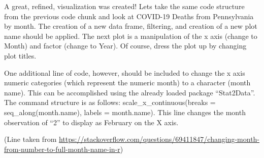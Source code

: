 \documentclass[
]{article}
\begin{document}
A great, refined, visualization was created! Lets take the same code
structure from the previous code chunk and look at COVID-19 Deaths from
Pennsylvania by month. The creation of a new data frame, filtering, and
creation of a new plot name should be applied. The next plot is a
manipulation of the x axis (change to Month) and factor (change to
Year). Of course, dress the plot up by changing plot titles.

One additional line of code, however, should be included to change the x
axis numeric categories (which represent the numeric month) to a
character (month name). This can be accomplished using the already
loaded package ``Stat2Data''. The command structure is as follows:
scale\_x\_continuous(breaks = seq\_along(month.name), labels =
month.name). This line changes the month observation of ``2'' to display
as February on the X axis.

(Line taken from
\url{https://stackoverflow.com/questions/69411847/changing-month-from-number-to-full-month-name-in-r})
\end{document}
